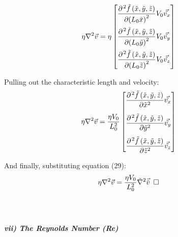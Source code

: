 \documentclass[titlepage]{article}
\begin{document}
\begin{align}
    \eta\nabla^2\vec{v} &={\eta}\begin{bmatrix}
        \displaystyle\frac{\partial^{\hspace*{1pt}2}{\tilde{f}\left(\tilde{x},\tilde{y},\tilde{z}\right)}}{\partial{\left(L_{0}\tilde{x}\right)^{2}}}{V_{0}}\vec{\tilde{v_{x}}} \\[0.45cm]
        \displaystyle\frac{\partial^{\hspace*{1pt}2}{\tilde{f}\left(\tilde{x},\tilde{y},\tilde{z}\right)}}{\partial{\left(L_{0}\tilde{y}\right)^{2}}}{V_{0}}\vec{\tilde{v_{y}}}  \\[0.45cm]
        \displaystyle\frac{\partial^{\hspace*{1pt}2}{\tilde{f}\left(\tilde{x},\tilde{y},\tilde{z}\right)}}{\partial{\left(L_{0}\tilde{z}\right)^{2}}}{V_{0}}\vec{\tilde{v_{z}}}
    \end{bmatrix} 
\end{align}

\noindent Pulling out the characteristic length and velocity:
\begin{align}
    \eta\nabla^2\vec{v} &= \displaystyle\frac{\eta{V_{0}}}{L_{0}^2}\begin{bmatrix}
        \displaystyle\frac{\partial^{\hspace*{1pt}2}{\tilde{f}\left(\tilde{x},\tilde{y},\tilde{z}\right)}}{\partial{\tilde{x}^{2}}}\vec{\tilde{v_{x}}} \\[0.45cm]
        \displaystyle\frac{\partial^{\hspace*{1pt}2}{\tilde{f}\left(\tilde{x},\tilde{y},\tilde{z}\right)}}{\partial{\tilde{y}^{2}}}\vec{\tilde{v_{y}}}  \\[0.45cm]
        \displaystyle\frac{\partial^{\hspace*{1pt}2}{\tilde{f}\left(\tilde{x},\tilde{y},\tilde{z}\right)}}{\partial{\tilde{z}^{2}}}\vec{\tilde{v_{z}}}
    \end{bmatrix}
\end{align}

\noindent And finally, substituting equation (29): 
\begin{align}
    \eta\nabla^2\vec{v} &= \displaystyle\frac{\eta{V_{0}}}{L_{0}^2}\tilde{\nabla}^2\vec{\tilde{v}}\hspace*{5pt}\square
\end{align}  \\  \\

\begin{center}
    \textbf{\emph{vii) The Reynolds Number (Re)}}
\end{center}
\end{document}
